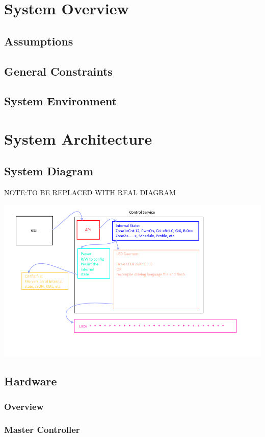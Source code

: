 \documentclass[onecolumn, draftclsnofoot,10pt, compsoc]{IEEEtran}
\begin{document}
	\section{System Overview}
		\subsection{Assumptions}
		\subsection{General Constraints}
		\subsection{System Environment}


	\section{System Architecture}
		\subsection{System Diagram}
		NOTE:TO BE REPLACED WITH REAL DIAGRAM

		\includegraphics[width=\linewidth]{systemDiagrams/sysdiag.png}

		\subsection{Hardware}
			\subsubsection{Overview}
			\subsubsection{Master Controller}
\end{document}
